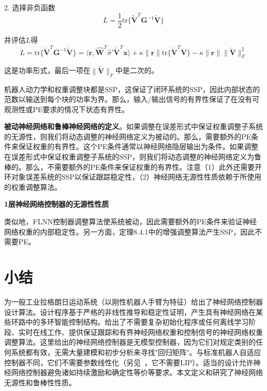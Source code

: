 \documentclass[12pt,a4paper]{ctexart}
\begin{document}
2. 选择非负函数
\begin{equation}
L = \frac{1}{2}\text{tr}\{\tilde{\bm{V}}^T \bm{G}^{-1} \tilde{\bm{V}}\}
\end{equation}

并评估$\dot{L}$得
\begin{equation}
\dot{L} = \text{tr}\{\tilde{\bm{V}}^T \bm{G}^{-1} \dot{\tilde{\bm{V}}}\} = \langle \bm{r}, \hat{\bm{W}}^T\hat{\sigma}'\tilde{\bm{V}}^T\bm{x} \rangle + \kappa\|\bm{r}\|\text{tr}\{\tilde{\bm{V}}^T\bm{V}\} - \kappa\|\bm{r}\|\|\tilde{\bm{V}}\|_F^2
\end{equation}

这是功率形式，最后一项在$\|\tilde{\bm{V}}\|_F$中是二次的。

机器人动力学和权重调整块都是SSP，这保证了闭环系统的SSP，因此内部状态的范数以输送到每个块的功率为界。那么，输入/输出信号的有界性保证了在没有可观测性或PE要求的情况下状态有界性。

\textbf{被动神经网络和鲁棒神经网络的定义}。如果调整在误差形式中保证权重调整子系统的无源性，则我们将动态调整的神经网络定义为被动的。那么，需要额外的PE条件来保证权重的有界性。这个PE条件通常以神经网络隐层输出为条件。如果调整在误差形式中保证权重调整子系统的SSP，则我们将动态调整的神经网络定义为鲁棒的。那么，不需要额外的PE条件来保证权重的有界性。注意（1）此外还需要开环对象误差系统的SSP以保证跟踪稳定性，（2）神经网络无源性性质依赖于所使用的权重调整算法。

\textbf{1层神经网络控制器的无源性性质}

类似地，FLNN控制器调整算法使系统被动，因此需要额外的PE条件来验证神经网络权重的内部稳定性。另一方面，定理8.4.1中的增强调整算法产生SSP，因此不需要PE。

\section{小结}

为一般工业拉格朗日运动系统（以刚性机器人手臂为特征）给出了神经网络控制器设计算法。设计程序基于严格的非线性推导和稳定性证明，产生具有神经网络在某些环路中的多环智能控制结构。给出了不需要复杂初始化程序或任何离线学习阶段、实时在线工作、提供保证跟踪和有界神经网络权重和控制信号的神经网络权重调整算法。这里给出的神经网络控制器是无模型控制器，因为它们对规定类别的任何系统都有效，无需大量建模和初步分析来寻找"回归矩阵"。与标准机器人自适应控制器不同，它们不需要参数线性化（另见~\cite{colbaugh1994}，它不需要LIP）。适当的设计允许神经网络控制器避免诸如持续激励和确定性等价等要求。本文定义和研究了神经网络无源性和鲁棒性性质。
\end{document}
